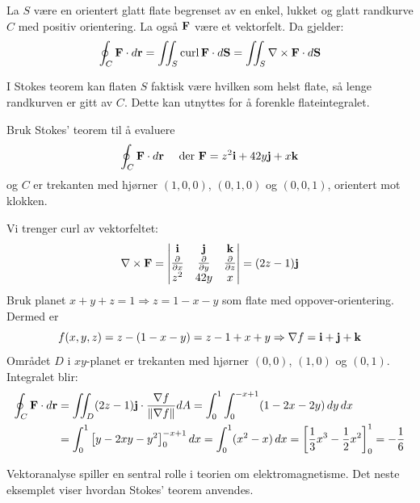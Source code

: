 \begin{thm}\label{thm:stokes}
La $S$ være en orientert glatt flate begrenset av en enkel, lukket og glatt randkurve $C$ med positiv orientering. La også $\mathbf{F}$ være et vektorfelt. Da gjelder:
\[
\oint_C \mathbf{F} \cdot d\mathbf{r} =\iint_S \operatorname{curl} \mathbf{F} \cdot d\mathbf{S} = \iint_S \nabla \times \mathbf{F} \cdot d\mathbf{S}
\]
\end{thm}
I Stokes teorem kan flaten $S$ faktisk være hvilken som helst flate, så lenge randkurven er gitt av $C$. Dette kan utnyttes for å forenkle flateintegralet.


\begin{eks}{}
Bruk Stokes’ teorem til å evaluere
\[
\oint_C \mathbf{F} \cdot d\mathbf{r} \quad \text{ der } \mathbf{F} = z^2 \mathbf{i} + 42y \mathbf{j} + x \mathbf{k}
\]
og $C$ er trekanten med hjørner $(1, 0, 0)$, $(0, 1, 0)$ og $(0, 0, 1)$, orientert mot klokken.

Vi trenger curl av vektorfeltet:
\[
\nabla \times \mathbf{F} = \begin{vmatrix}
\mathbf{i} & \mathbf{j} & \mathbf{k} \\
\frac{\partial}{\partial x} & \frac{\partial}{\partial y} & \frac{\partial}{\partial z} \\
z^2 & 42y & x
\end{vmatrix}
= (2z - 1)\mathbf{j}
\]
Bruk planet $x + y + z = 1 \Rightarrow z = 1 - x - y$ som flate med oppover-orientering. Dermed er 
\[
f(x, y, z) = z - (1 - x - y) = z - 1 + x + y
\Rightarrow \nabla f = \mathbf{i} + \mathbf{j} + \mathbf{k}
\]
Området $D$ i $xy$-planet er trekanten med hjørner $(0,0)$, $(1,0)$ og $(0,1)$.
Integralet blir:
\begin{align*}
\oint_C \mathbf{F} \cdot d\mathbf{r}
&= \iint_D (2z - 1) \mathbf{j} \cdot \frac{\nabla f}{\|\nabla f\|} dA
= \int_0^1 \int_0^{-x + 1} (1 - 2x - 2y) \, dy \, dx\\
&= \int_0^1 \left[ y - 2xy - y^2 \right]_0^{-x+1} dx
= \int_0^1 (x^2 - x) \, dx
= \left[\frac{1}{3}x^3 - \frac{1}{2}x^2 \right]_0^1
= -\frac{1}{6}
\end{align*}
\end{eks}

Vektoranalyse spiller en sentral rolle i teorien om elektromagnetisme. Det neste eksemplet viser hvordan Stokes’ teorem anvendes.

